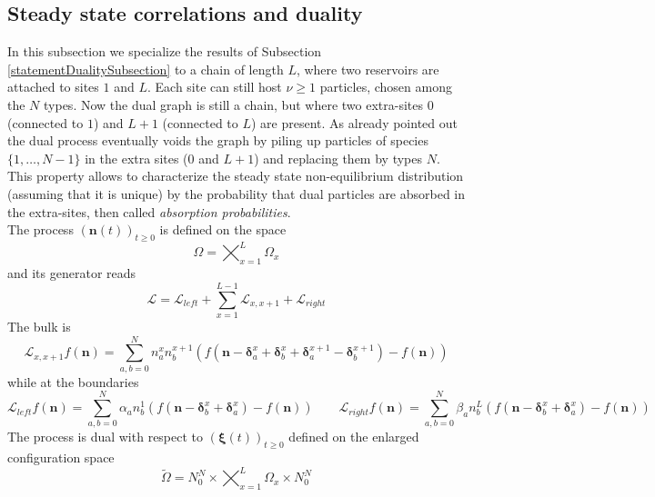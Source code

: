 \documentclass[10pt]{article}
\numberwithin{equation}{section}
\numberwithin{equation}{subsection}
\begin{document}
\subsection{Steady state correlations and duality}\label{Subsection-ss-nonI}
In this subsection we specialize the results of Subsection \ref{statementDualitySubsection} to a chain of length $L$, where two reservoirs are attached to sites $1$ and $L$. Each site can still host $\nu\geq 1$ particles, chosen among the $N$ types. Now the dual graph is still a chain, but where two extra-sites $0$ (connected to $1$) and $L+1$ (connected to $L$) are present. As already pointed out the dual process eventually voids the graph by piling up particles of species $\{1,\ldots,N-1\}$ in the extra sites ($0$ and $L+1$) and replacing them by types $N$. This property allows to characterize the steady state non-equilibrium distribution (assuming that it is unique) by the probability that dual particles are absorbed in the extra-sites, then called \textit{absorption probabilities}. \\The process $\left(\bm{n}(t)\right)_{t\geq0}$ is defined on the space
 \begin{equation}\label{stateSpace-Chain}
 	\Omega=\bigtimes_{x=1}^{L} \Omega_{x}
 \end{equation} and its generator reads
\begin{equation}
	\mathcal{L}=\mathcal{L}_{left}+\sum_{x=1}^{L-1}\mathcal{L}_{x,x+1}+\mathcal{L}_{right}
\end{equation} 
The bulk is 
\begin{equation}
	\mathcal{L}_{x,x+1}f(\bm{n})=\sum_{a,b=0}^{N}n_{a}^{x}n_{b}^{x+1}\left(f(\bm{n}-\bm{\delta}_{a}^{x}+\bm{\delta}_{b}^{x}+\bm{\delta}_{a}^{x+1}-\bm{\delta}_{b}^{x+1})-f(\bm{n})\right)
\end{equation}
while at the boundaries 
\begin{equation}
	\mathcal{L}_{left}f(\bm{n})=\sum_{a,b=0}^{N}\alpha_{a}n_{b}^{1}\left(f(\bm{n}-\bm{\delta}_{b}^{x}+\bm{\delta}_{a}^{x})-f(\bm{n})\right)\qquad \mathcal{L}_{right}f(\bm{n})=\sum_{a,b=0}^{N}\beta_{a}n_{b}^{L}\left(f(\bm{n}-\bm{\delta}_{b}^{x}+\bm{\delta}_{a}^{x})-f(\bm{n})\right)
\end{equation}
 The process is dual with respect to $(\bm{\xi}(t))_{t\geq0} $ defined on the enlarged configuration space
\begin{equation}\label{stateSpaceDUAL-Chain}	
	\widetilde{\Omega}=N_{0}^{N}\times\bigtimes_{x=1}^{L} \Omega_{x}\times N_{0}^{N}
\end{equation}
\end{document}
